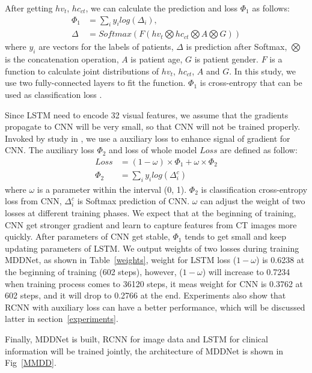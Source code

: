 After getting $hv_t$, $hc_{ct}$, we can calculate the prediction and loss $\Phi_1$ as follows:
\begin{align*}\label{classifyandloss1}
    \Phi_1 &= \sum_i{y_i log(\Delta_i)}, \\
    \Delta &= Softmax(F(hv_t \bigotimes hc_{ct} \bigotimes A \bigotimes G))
\end{align*}
where $y_i$ are vectors for the labels of patients, $\Delta$ is prediction after Softmax, $\bigotimes$ is the concatenation operation, $A$ is patient age, $G$ is patient gender. $F$ is a function to calculate joint distributions of $hv_t$, $hc_{ct}$, $A$ and $G$. In this study, we use two fully-connected layers to fit the function. $\Phi_1$ is cross-entropy that can be used as classification loss \cite{Zreik2018A}.

Since LSTM need to encode 32 visual features, we assume that the gradients propagate to CNN will be very small, so that CNN will not be trained properly. Invoked by study in \cite{szegedy2016rethinking}, we use a auxiliary loss to enhance signal of gradient for CNN.
The auxiliary loss $\Phi_2$ and loss of whole model $Loss$ are defined as follow: 
\begin{align*}
Loss &=  (1 - \omega) \times \Phi_1 +  \omega \times \Phi_2 \\
\Phi_2 &= \sum_i{y_i log(\Delta^c_i)}
\end{align*}
where $\omega$ is a parameter within the interval (0, 1). $\Phi_2$ is classification cross-entropy loss from CNN, $\Delta^c_i$ is Softmax prediction of CNN. $\omega$ can adjust the weight of two losses at different training phases.
We expect that at the beginning of training, CNN get stronger gradient and learn to capture features from CT images more quickly. After parameters of CNN get stable, $\Phi_1$ tends to get small and keep updating parameters of LSTM. We output weights of two losses during training MDDNet, as shown in Table~\ref{weights}, weight for LSTM loss ($1 - \omega$) is 0.6238 at the beginning of training (602 steps), however, ($1 - \omega$) will increase to 0.7234 when training process comes to 36120 steps, it meas weight for CNN is 0.3762 at 602 steps, and it will drop to 0.2766 at the end. Experiments also show that RCNN with auxiliary loss can have a better performance, which will be discussed latter in section~\ref{experiments}.

Finally, MDDNet is built, RCNN for image data and LSTM for clinical information will be trained jointly, the architecture of MDDNet is shown in Fig~\ref{MMDD}. 



